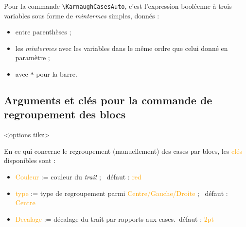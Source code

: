 \documentclass[french,a4paper,11pt]{article}
\newcommand\Cle[1]{{\small\sffamily\textlangle \textcolor{orange}{#1}\textrangle}}
\begin{document}
{{\begin{tipblock}
Pour la commande \texttt{\textbackslash KarnaughCasesAuto}, c'est l'expression booléenne à trois variables sous forme de \textit{mintermes} simples, donnés :
%
\begin{itemize}
	\item entre parenthèses ;
	\item les \textit{mintermes} avec les variables dans le même ordre que celui donné en paramètre ;
	\item avec \texttt{*} pour la barre.
\end{itemize}
\vspace*{-\baselineskip}\leavevmode
\end{tipblock}

\begin{DemoCode}[]
\begin{TableKarnaugh}
\end{TableKarnaugh}
\begin{TableKarnaugh}[Swap]
\end{TableKarnaugh}

\begin{TableKarnaugh}[Variables=k/l/m,StyleAlternatif]
\end{TableKarnaugh}
\end{DemoCode}

\pagebreak

\subsection{Arguments et clés pour la commande de regroupement des blocs}

\begin{DemoCode}
\begin{TableKarnaugh}[clés]<options tikz>
\end{TableKarnaugh}
\end{DemoCode}

\begin{tipblock}
En ce qui concerne le regroupement (manuellement) des cases par blocs, les \Cle{clés} disponibles sont :

\begin{itemize}
	\item \Cle{Couleur} := couleur du \textit{trait} ; \hfill~défaut : \Cle{red}
	\item \Cle{type} := type de regroupement parmi \Cle{Centre/Gauche/Droite} ; \hfill~défaut : \Cle{Centre}
	\item \Cle{Decalage} := décalage du trait par rapports aux cases.\hfill~défaut : \Cle{2pt}
\end{itemize}


\end{tipblock}}}
\end{document}
